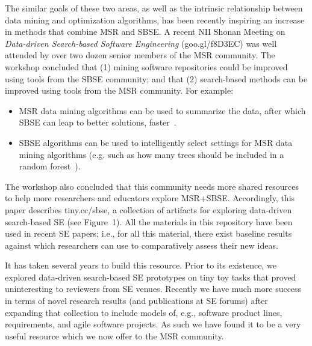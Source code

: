 \documentclass[sigconf,anonymous,review]{acmart}
\newcommand\TODO[1]{\textcolor{ScarletRed}{\textbf{\colorbox{yellow}{\small TODO:}} \emph{#1}}\xspace}
\begin{document}
{The similar goals of these two areas, as well as the intrinsic relationship between data mining and optimization algorithms, has been recently inspiring an} increase in methods that combine MSR and SBSE.
A recent {NII Shonan Meeting}  on {\em Data-driven Search-based Software
Engineering} (goo.gl/f8D3EC)   was well attended by over two dozen senior members of the MSR community.
The workshop concluded that (1) mining software repositories could be improved using {tools from the SBSE community}; and that (2) search-based methods can be improved using tools from the MSR community. 
For example:
\begin{itemize}
\item
MSR data mining algorithms can be used to summarize the data, after which SBSE can leap to better solutions, faster~\cite{krall2015gale}.
\item
SBSE {algorithms} can be used to intelligently select 
settings for MSR data mining algorithms (e.g.
such as how many trees should be included in a random
forest~\cite{fu2016tuning}).
\end{itemize}
The workshop also concluded that this community needs more shared  resources 
to help more researchers and educators explore MSR+SBSE.
Accordingly, this paper describes  tiny.cc/sbse,
a collection of artifacts for exploring
data-driven search-based SE (see Figure~1). 
All the materials in this repository
have been used in recent SE papers; i.e., for all this material, there exist baseline results against which researchers can use to comparatively assess their new ideas.

It has taken several years to build this resource. Prior to its
existence, we explored data-driven search-based SE
prototypes on tiny toy tasks that proved 
uninteresting to 
 reviewers from SE venues. 
Recently we have much more success in terms of novel
research results
(and publications at SE forums) after 
expanding that collection
to include models
of, e.g., software product lines, requirements, and
agile software projects. 
As such we have found it to be a very useful resource
which we now offer to the MSR community.






\end{document}
